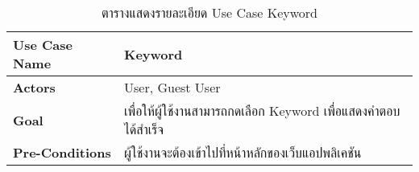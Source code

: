 \documentclass[12pt,oneside,openright,a4paper]{cpe-thai-project}
\begin{document}
\begin{table}[!h]
\caption{ตารางแสดงรายละเอียด Use Case Keyword}\label{tbl:table3.8}
\begin{tabular}{|l|ll|}
\hline
\textbf{Use Case Name}     & \multicolumn{2}{l|}{Keyword}                                                                                                                                                                                                                                                                                                                                                                                                                                                                                                                     \\ \hline
\textbf{Actors}            & \multicolumn{2}{l|}{User, Guest User}                                                                                                                                                                                                                                                                                                                                                                                                                                                                                                            \\ \hline
\textbf{Goal}              & \multicolumn{2}{l|}{เพื่อให้ผู้ใช้งานสามารถกดเลือก Keyword เพื่อแสดงคำตอบได้สำเร็จ}                                                                                                                                                                                                                                                                                                                                                                                                                                                              \\ \hline
\textbf{Pre-Conditions}    & \multicolumn{2}{l|}{ผู้ใช้งานจะต้องเข้าไปที่หน้าหลักของเว็บแอปพลิเคชัน}                                                                                                                                                                                                                                                                                                                                                                                                                                                                          \\ \hline

\end{tabular}
\end{table}
\end{document}
